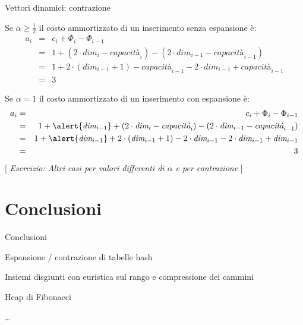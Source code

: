 \begin{frame}[shrink]{Vettori dinamici: contrazione}

Se $\alpha \geq \frac{1}{2}$ il costo ammortizzato di un inserimento senza espansione è: 
{\small
\begin{eqnarray*}
a_i &=& c_i + \Phi_i - \Phi_{i-1} \\
    &=& 1 + ( 2 \cdot \textit{dim}_i - \textit{capacità}_i) - ( 2 \cdot \textit{dim}_{i-1} - \textit{capacità}_{i-1})\\
    &=& 1 +  2 \cdot (\textit{dim}_{i-1}+1) - \textit{capacità}_{i-1} -  2 \cdot \textit{dim}_{i-1} + \textit{capacità}_{i-1}\\
    &=& 3
\end{eqnarray*}
}

Se $\alpha = 1$ il costo ammortizzato di un inserimento \alert{con espansione} è: 
{\small
\begin{eqnarray*}
a_i &=& c_i + \Phi_i - \Phi_{i-1} \\
    &=& 1 + \alert{\textit{dim}_{i-1}} + ( 2 \cdot \textit{dim}_i - \textit{capacità}_i) - ( 2 \cdot \textit{dim}_{i-1} - \textit{capacità}_{i-1})\\
    &=& 1 + \alert{\textit{dim}_{i-1}} +  2 \cdot (\textit{dim}_{i-1}+1) - 2 \cdot \textit{dim}_{i-1} -  2 \cdot \textit{dim}_{i-1} + \textit{dim}_{i-1}\\
    &=& 3
\end{eqnarray*}
}
[ \emph{Esercizio: Altri casi per valori differenti di $\alpha$ e per contrazione} ]
\end{frame}

\section{Conclusioni}

\begin{frame}{Conclusioni}
\BIL
\item Espansione / contrazione di tabelle hash
\item Insiemi disgiunti con euristica sul rango e compressione dei cammini
\item Heap di Fibonacci
\item \ldots
\EIL
	
\end{frame}





